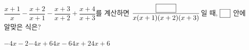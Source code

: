 \hspace*{2mm}\begin{minipage}[t]{\dimexpr\linewidth-2mm\relax}\vspace{0pt}
$\dfrac{x+1}{x}-\dfrac{x+2}{x+1}-\dfrac{x+3}{x+2}+\dfrac{x+4}{x+3}$를 계산하면 $\dfrac{\blank[3em]}{x(x+1)(x+2)(x+3)}$일 때, $\blank$ 안에 알맞은 식은?
\begin{choices32}{$-4x-2$}{$-4x+6$}{$4x-6$}{$4x+2$}{$4x+6$}\end{choices32}\end{minipage}

